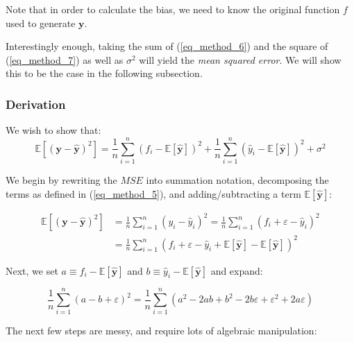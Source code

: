 \documentclass[a4paper,10pt,english]{article}
\begin{document}
Note that in order to calculate the bias, we need to know the original function $f$ used to generate $\mathbf{y}$.

Interestingly enough, taking the sum of (\ref{eq_method_6}) and the square of (\ref{eq_method_7}) as well as $\sigma^2$ will yield the \textit{mean squared error}.  We will show this to be the case in the following subsection.

\subsubsection*{Derivation}

We wish to show that:
\begin{equation}
\label{eq_method_8}
\mathbb{E}\left[(\mathbf{y}-\hat{\mathbf{y}})^{2}\right]
=\frac{1}{n} \sum_{i=1}^{n}(f_{i}-\mathbb{E}[\hat{\mathbf{y}}])^{2}+\frac{1}{n} \sum_{i=1}^{n}(\hat{y}_{i}-\mathbb{E}[\hat{\mathbf{y}}])^{2}+\sigma^{2}
\end{equation}

We begin by rewriting the $MSE$ into summation notation, decomposing the terms as defined in (\ref{eq_method_5}), and adding/subtracting a term $\mathbb{E}[\hat{\mathbf{y}}]$:

\begin{align*}
\mathbb{E}\left[(\mathbf{y}-\hat{\mathbf{y}})^{2}\right] &= \frac{1}{n} \sum_{i=1}^{n} ( y_i - \hat{y}_i )^2 = \frac{1}{n} \sum_{i=1}^{n} ( f_i + \varepsilon - \hat{y}_i )^2 \\
&= \frac{1}{n} \sum_{i=1}^{n} ( f_i + \varepsilon - \hat{y}_i  + \mathbb{E}[\hat{\mathbf{y}}] - \mathbb{E}[\hat{\mathbf{y}}] )^2
\end{align*}

Next, we set $a \equiv f_i - \mathbb{E}[\hat{\mathbf{y}}] $ and $b \equiv \hat{y}_i - \mathbb{E}[\hat{\mathbf{y}}]$ and expand:

\begin{equation*}
\frac{1}{n} \sum_{i=1}^{n} (a - b + \varepsilon )^2
= \frac{1}{n} \sum_{i=1}^{n} ( a^2 - 2ab + b^2 - 2b\varepsilon + \varepsilon^2 + 2a\varepsilon )
\end{equation*}

The next few steps are messy, and require lots of algebraic manipulation:	
\end{document}
